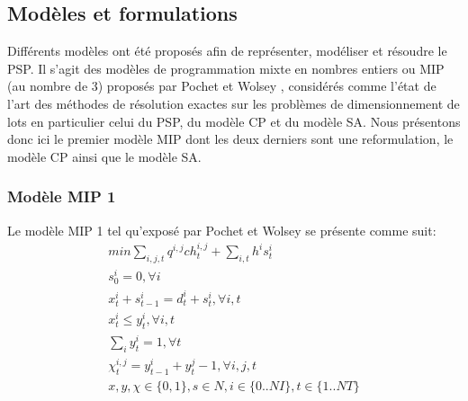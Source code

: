 		\subsection{Modèles et formulations}
		Différents modèles ont été proposés afin de représenter, modéliser et résoudre le PSP. Il s'agit des modèles de programmation mixte en nombres entiers ou MIP (au nombre de 3) proposés par Pochet et Wolsey \cite{pochet_wolsey}, considérés comme l'état de l'art des méthodes de résolution exactes sur les problèmes de dimensionnement de lots en particulier celui du PSP, du modèle CP et du modèle SA. Nous présentons donc ici le premier modèle MIP dont les deux derniers sont une reformulation, le modèle CP ainsi que le modèle SA.
		\subsubsection{Modèle MIP 1}
		
		Le modèle MIP 1 \cite{pochet_wolsey} tel qu'exposé par Pochet et Wolsey se présente comme suit:
		\begin{eqnarray}
			min \sum_{i,j,t} q^{i,j}ch_{t}^{i,j} + \sum_{i,t} h^{i} s_{t}^{i} \\
			s_{0}^{i} = 0, \forall i \\
			x_{t}^{i} + s_{t-1}^{i} = d_{t}^{i} + s_{t}^{i}, \forall i,t \\
			x_{t}^{i} \leq y_{t}^{i}, \forall i,t \\
			\sum_{i} y_{t}^{i} = 1 , \forall t \\
			\chi_{t}^{i,j} = y_{t-1}^{i} + y_{t}^{j} - 1, \forall i,j,t \\
			x,y,\chi \in \{0,1\}, s \in N, i \in \{0..NI\}, t \in \{1..NT\}
		\end{eqnarray}
		

